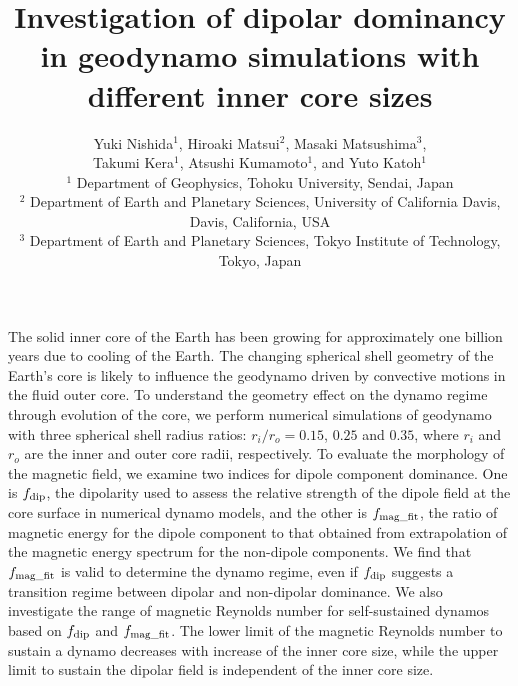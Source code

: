 \documentclass[mreferee]{gji}
\title[Dipolar dominance in geodynamo with different inner core sizes]
{Investigation of dipolar dominancy in geodynamo simulations with different inner core sizes}
\author[Y. Nishida et al.]
{Yuki Nishida$^1$, Hiroaki Matsui$^2$, Masaki Matsushima$^3$,\\ 
{\rm \LARGE
Takumi Kera$^1$, Atsushi Kumamoto$^1$, and Yuto Katoh$^1$ }\\
  $^1$ Department of Geophysics, Tohoku University, Sendai, Japan \\
  $^2$ Department of Earth and Planetary Sciences, University of California Davis, Davis, California, USA \\
  $^3$ Department of Earth and Planetary Sciences, Tokyo Institute of Technology, Tokyo, Japan
  }
\date{ }
\begin{document}
\maketitle
%
\begin{summary}
The solid inner core of the Earth has been growing for approximately one billion years due to cooling of the Earth.
The changing spherical shell geometry of the Earth’s core is likely to influence the geodynamo driven by convective motions in the fluid outer core.
To understand the geometry effect on the dynamo regime through evolution of the core, we perform numerical simulations of geodynamo with three spherical shell radius ratios: $r_{i}/r_{o} = 0.15$, $0.25$ and $0.35$, where $r_{i}$ and $r_{o}$ are the inner and outer core radii, respectively.
To evaluate the morphology of the magnetic field, we examine two indices for dipole component dominance.
{\color{red}One is $f_{\rm dip}$, the dipolarity used to assess the relative strength of the dipole field at the core surface in numerical dynamo models, and the other is $f_{\rm mag\_fit}$, the ratio of magnetic energy for the dipole component to that obtained from extrapolation of the magnetic energy spectrum for the non-dipole components.}
{\color{red}We find that $f_{\rm mag\_fit}$ is valid to determine the dynamo regime, even if $f_{\rm dip}$ suggests a transition regime between dipolar and non-dipolar dominance.}
We also investigate the range of 
{\color{blue} magnetic Reynolds number}
for self-sustained dynamos based on $f_{\rm dip}$ and $f_{\rm mag\_fit}$.
{\color{blue} 
The lower limit of the magnetic Reynolds number to sustain a dynamo decreases with increase of the inner core size, while the upper limit to sustain the dipolar field is independent of the inner core size. 
}
\end{summary}
\end{document}

